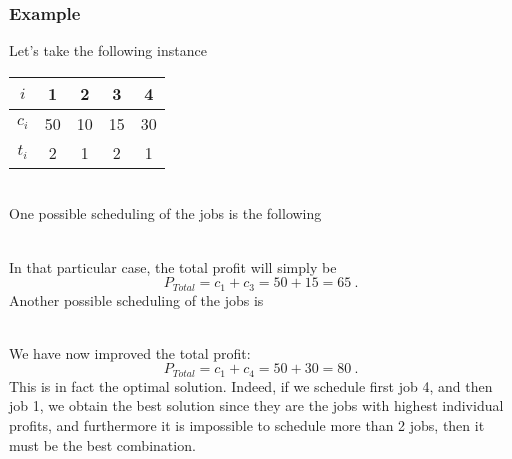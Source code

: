 \subsubsection{Example}
Let's take the following instance
\begin{table}[h!]
\centering
\begin{tabular}{c|cccc}
$i$ & 1 & 2 & 3 & 4 \\
\hline $c_i$ & 50 & 10 & 15 & 30 \\
$t_i$ & 2 & 1 & 2 & 1
\end{tabular}
\end{table} ~\\
One possible scheduling of the jobs is the following
\begin{figure}[h!]
\centering


\end{figure} ~\\
In that particular case, the total profit will simply be
\begin{equation*}
P_{Total} = c_1 + c_3 = 50 +15 = 65 \: .
\end{equation*}
Another possible scheduling of the jobs is
\begin{figure}[h!]
\centering


\end{figure} ~\\
We have now improved the total profit:
\begin{equation*}
P_{Total} = c_1 + c_4 = 50 + 30 = 80 \: .
\end{equation*}
This is in fact the optimal solution. Indeed, if we schedule first job 4, and then job 1, we obtain the best solution since they are the jobs with highest individual profits, and furthermore it is impossible to schedule more than 2 jobs, then it must be the best combination.


